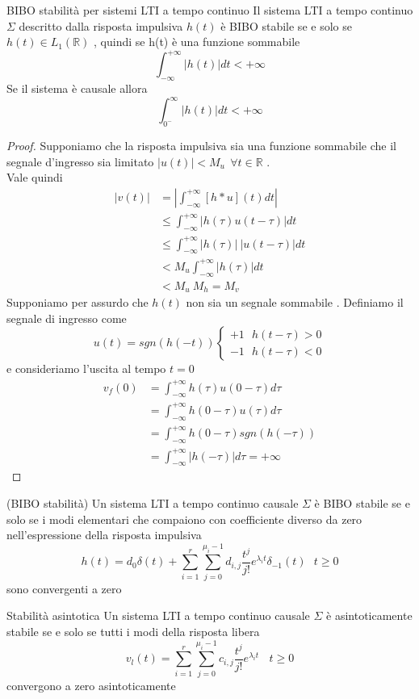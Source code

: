 \documentclass{article}
\theoremstyle{definition}
\newcommand{\R}{\mathbb{R}}
\newcommand{\la}{\lambda}
\newcommand{\intinf}{\int_{-\infty}^{+\infty}}
\begin{document}
		\begin{teo}{BIBO stabilità per sistemi LTI a tempo continuo}
			Il sistema LTI a tempo continuo $\Sigma$ descritto dalla risposta impulsiva $h(t)$ è BIBO stabile se e solo se $h(t)\in L_1(\R)$ , quindi se h(t) è una funzione sommabile 
			$$\intinf |h(t)|dt < +\infty$$
			Se il sistema è causale allora 
			$$\int_{0^-}^{\infty}|h(t)|dt < +\infty$$
		\end{teo}
		\begin{proof}
Supponiamo che la risposta impulsiva sia una funzione sommabile  che il segnale d'ingresso sia limitato $|u(t)| < M_u \ \ \forall t \in \R$ . \\Vale quindi 	
\begin{align*}
	|v(t)|&=|\intinf [h*u](t) dt | \\
	&\leq \intinf |h(\tau)u(t-\tau)|dt \\
		&\leq \intinf |h(\tau)| \ |u(t-\tau)|dt \\
		&< M_u \intinf |h(\tau)| dt \\
		& < M_u \ M_h=M_v
	\end{align*}
Supponiamo per assurdo che $h(t)$ non sia un segnale sommabile . Definiamo il segnale di ingresso come 
$$u(t)=sgn(h(-t))\begin{cases}
	+1 \ \ \ h(t-\tau) >0 \\
	-1 \ \ \ h(t-\tau) < 0 
\end{cases}$$ e consideriamo l'uscita al tempo $t=0$ 
\begin{align*}
	v_f(0)&= \intinf h(\tau)u(0-\tau) d\tau \\
	&=\intinf h(0-\tau)u(\tau) d\tau \\
	&=\intinf h(0-\tau) sgn(h(-\tau)) \\
	&=\intinf |h(-\tau) | d\tau = +\infty 
\end{align*}
	\end{proof}
	\begin{teo}{(BIBO stabilità)}{}
		Un sistema LTI a tempo continuo causale $\Sigma$ è BIBO stabile se e solo se i modi elementari che compaiono con coefficiente diverso da zero nell'espressione della risposta impulsiva 
		$$h(t)=d_0 \delta(t)+\sum_{i=1}^{r}\sum_{j=0}^{\mu_i-1}d_{i,j}\frac{t^j}{j!}e^{\la_i t}\delta_{-1}(t) \ \ \ t \geq 0$$  
		sono convergenti a zero 
	\end{teo}
	\begin{teo}{Stabilità asintotica} {}
		Un sistema LTI a tempo continuo causale $\Sigma$ è asintoticamente stabile se e solo se tutti i modi della risposta libera 
		$$v_l(t)=\sum_{i=1}^{r}\sum_{j=0}^{\mu_i-1}c_{i,j}\frac{t^j}{j!}e^{\la_i t}\ \ \ \ t \geq 0$$
convergono a zero asintoticamente 
	\end{teo}
	\newpage
\end{document}
